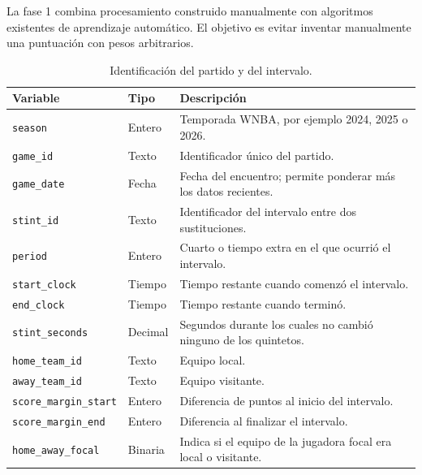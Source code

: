 La fase 1 combina procesamiento construido manualmente con algoritmos existentes de aprendizaje automático. El objetivo es evitar inventar manualmente una puntuación con pesos arbitrarios.

\begin{longtable}{@{}p{3.2cm}p{1.8cm}p{7.7cm}@{}}
\caption{Identificación del partido y del intervalo.}\\
\toprule\textbf{Variable}&\textbf{Tipo}&\textbf{Descripción}\\\midrule\endhead
\texttt{season}&Entero&Temporada WNBA, por ejemplo 2024, 2025 o 2026.\\
\texttt{game\_id}&Texto&Identificador único del partido.\\
\texttt{game\_date}&Fecha&Fecha del encuentro; permite ponderar más los datos recientes.\\
\texttt{stint\_id}&Texto&Identificador del intervalo entre dos sustituciones.\\
\texttt{period}&Entero&Cuarto o tiempo extra en el que ocurrió el intervalo.\\
\texttt{start\_clock}&Tiempo&Tiempo restante cuando comenzó el intervalo.\\
\texttt{end\_clock}&Tiempo&Tiempo restante cuando terminó.\\
\texttt{stint\_seconds}&Decimal&Segundos durante los cuales no cambió ninguno de los quintetos.\\
\texttt{home\_team\_id}&Texto&Equipo local.\\
\texttt{away\_team\_id}&Texto&Equipo visitante.\\
\texttt{score\_margin\_start}&Entero&Diferencia de puntos al inicio del intervalo.\\
\texttt{score\_margin\_end}&Entero&Diferencia al finalizar el intervalo.\\
\texttt{home\_away\_focal}&Binaria&Indica si el equipo de la jugadora focal era local o visitante.\\
\bottomrule
\end{longtable}

